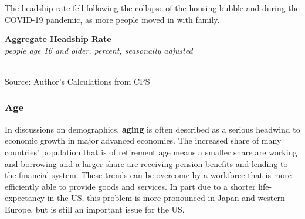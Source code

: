 \documentclass{report}
\makeatletter
\newcommand{\tbllink}[1]{\href{https://raw.githubusercontent.com/bdecon/US-chartbook/master/chartbook/data/#1}{\faTable}}
\newcommand*\short[1]{\expandafter\@gobbletwo\number\numexpr#1\relax}
\newcommand{\shdateaxisticks}{
		date coordinates in=x, axis line style={draw=none},
		xmax={2023-02-15},
		max space between ticks=40,	    
		xtick={{1990-01-01}, {1995-01-01}, {2000-01-01}, 
			{2005-01-01}, {2010-01-01}, {2015-01-01}, {2020-01-01}},
		minor xtick={},
		enlarge y limits={0.06}, enlarge x limits={0.01},
		}
\newcommand{\stdline}[4]{\addplot[very thick, no markers, color=#1] 
		table [x=#2, y=#3, col sep=comma] {#4};	}
\newcommand{\rebars}{
		\fill[color=black!10] (axis cs:{2007-12-01},\pgfkeysvalueof{/pgfplots/ymin}) rectangle 
			(axis cs:{2009-07-01}, \pgfkeysvalueof{/pgfplots/ymax});
		\fill[color=black!10] (axis cs:{2001-03-01},\pgfkeysvalueof{/pgfplots/ymin}) rectangle 
			(axis cs:{2001-11-01}, \pgfkeysvalueof{/pgfplots/ymax});
		\fill[color=black!10] (axis cs:{2020-02-01},\pgfkeysvalueof{/pgfplots/ymin}) rectangle 
			(axis cs:{2020-05-01}, \pgfkeysvalueof{/pgfplots/ymax});}
\makeatother
\begin{document}
{\begin{minipage}{0.25\textwidth}
\small The headship rate fell following the collapse of the housing bubble and during the COVID-19 pandemic, as more people moved in with family. 
\end{minipage}\hspace{6mm}
\begin{minipage}{0.47\textwidth}
\normalsize \textbf{Aggregate Headship Rate}\\
\footnotesize{\textit{people age 16 and older, percent, seasonally adjusted}}\\
\hspace*{-2mm} \\
\footnotesize{Source: Author's Calculations from CPS} \hfill \tbllink{headship.csv} 
\end{minipage}
\newpage
\begin{minipage}{0.76\textwidth}
\subsubsection*{Age}
\small In discussions on demographics, \textbf{aging} is often described as a serious headwind to economic growth in major advanced economies. The increased share of many countries' population that is of retirement age means a smaller share are working and borrowing and a larger share are receiving pension benefits and lending to the financial system. These trends can be overcome by a workforce that is more efficiently able to provide goods and services. In part due to a shorter life-expectancy in the US, this problem is more pronounced in Japan and western Europe, but is still an important issue for the US.


\end{minipage}}
\end{document}
